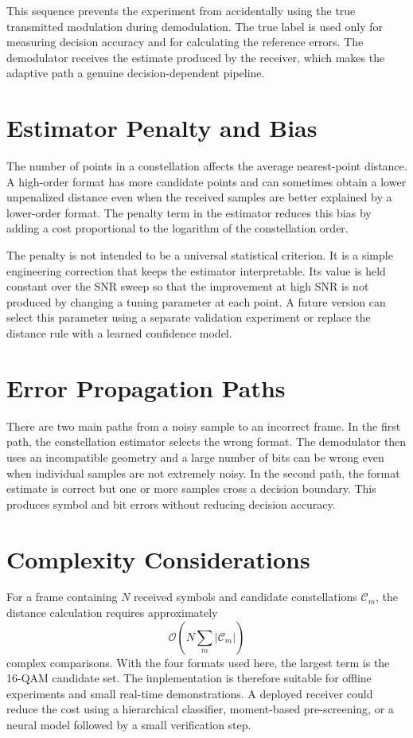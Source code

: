 \documentclass[12pt,twoside,openright]{report}
\begin{document}
This sequence prevents the experiment from accidentally using the true
transmitted modulation during demodulation. The true label is used only for
measuring decision accuracy and for calculating the reference errors. The
demodulator receives the estimate produced by the receiver, which makes the
adaptive path a genuine decision-dependent pipeline.

\section{Estimator Penalty and Bias}
The number of points in a constellation affects the average nearest-point
distance. A high-order format has more candidate points and can sometimes
obtain a lower unpenalized distance even when the received samples are
better explained by a lower-order format. The penalty term in the estimator
reduces this bias by adding a cost proportional to the logarithm of the
constellation order.

The penalty is not intended to be a universal statistical criterion. It is a
simple engineering correction that keeps the estimator interpretable. Its
value is held constant over the SNR sweep so that the improvement at high
SNR is not produced by changing a tuning parameter at each point. A future
version can select this parameter using a separate validation experiment or
replace the distance rule with a learned confidence model.

\section{Error Propagation Paths}
There are two main paths from a noisy sample to an incorrect frame. In the
first path, the constellation estimator selects the wrong format. The
demodulator then uses an incompatible geometry and a large number of bits
can be wrong even when individual samples are not extremely noisy. In the
second path, the format estimate is correct but one or more samples cross a
decision boundary. This produces symbol and bit errors without reducing
decision accuracy.

\section{Complexity Considerations}
For a frame containing $N$ received symbols and candidate constellations
$\mathcal{C}_m$, the distance calculation requires approximately
\[
\mathcal{O}\left(N\sum_m|\mathcal{C}_m|\right)
\]
complex comparisons. With the four formats used here, the largest term is
the 16-QAM candidate set. The implementation is therefore suitable for
offline experiments and small real-time demonstrations. A deployed receiver
could reduce the cost using a hierarchical classifier, moment-based
pre-screening, or a neural model followed by a small verification step.
\end{document}
